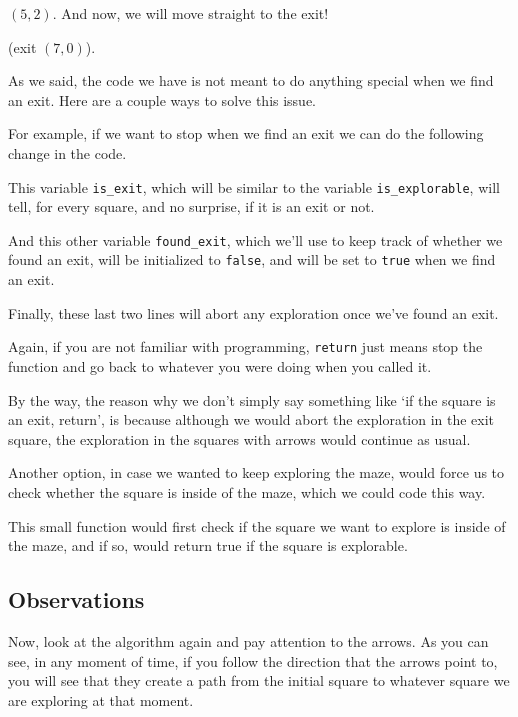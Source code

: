 \documentclass[12pt]{article}
\renewcommand{\v}[1]{\texttt{#1}}
\begin{document}
$(5, 2)$. And now, we will move straight to the exit!

(exit $(7, 0)$). 

As we said, the code we have is not meant to do anything special
when we find an exit. Here are a couple ways to solve this issue.

For example, if we want to stop when we find an exit
we can do the following change in the code.

This variable \verb|is_exit|, which will be similar to the
variable \verb|is_explorable|, will tell, for every square,
and no surprise, if it is an exit or not. 

And this other variable \verb|found_exit|, which we'll use
to keep track of whether we found an exit, will be initialized
to \v{false}, and will be set to \v{true} when we find an exit.

Finally, these last two lines will abort any exploration once
we've found an exit.

Again, if you are not familiar with programming,
\v{return} just means stop the function and go back to whatever
you were doing when you called it.

By the way, the reason why we don't simply say something like
`if the square is an exit, return', is because although we would
abort the exploration in the exit square, the exploration
in the squares with arrows would continue as usual.

Another option, in case we wanted to keep exploring the maze,
would force us to check whether the square
is inside of the maze, which we could code this way.

This small function would first check if the square we want to explore is
inside of the maze, and if so, would return true if the square is explorable.


\subsection{Observations}

Now, look at the algorithm again and pay attention to the arrows.
As you can see, in any moment of time,
if you follow the direction that the arrows point to,
you will see that they create a path from the initial
square to whatever square we are exploring at that moment.
\end{document}

